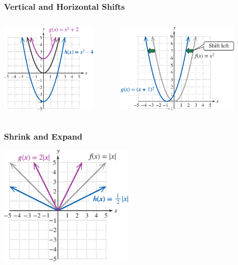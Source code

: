 \documentclass{beamer}
\begin{document}
\begin{frame}\frametitle{Vertical and Horizontal Shifts}
\begin{columns}
\begin{column}{5.0cm}
\begin{center}
\includegraphics[height=4.5cm]{fig/shiftV.png}
\end{center}
\end{column}
\begin{column}{6.0cm}
\begin{center}
\includegraphics[height=4.5cm]{fig/shiftH.png}
\end{center}
\end{column}
\end{columns}
\end{frame}

\begin{frame}\frametitle{Shrink and Expand}

\begin{center}
\includegraphics[height=6.0cm]{fig/stretchV.png}
\end{center}

\end{frame}
\end{document}
